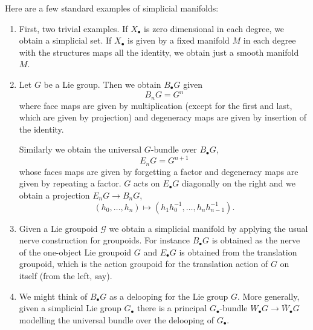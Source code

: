 \documentclass{amsart}
\begin{document}
\begin{example}
    Here are a few standard examples of simplicial manifolds: 
    \begin{enumerate}
        \item First, two trivial examples. If $X_\bullet$ is zero dimensional in 
            each degree, we obtain a simplicial set. If $X_\bullet$ is given by
            a fixed manifold $M$ in each degree with the structures maps all the
            identity, we obtain just a smooth manifold $M$.
        \item Let $G$ be a Lie group. Then we obtain $B_\bullet G$ given
            \begin{equation*}
                B_nG = G^n
            \end{equation*}
            where face maps are given by multiplication (except for the first 
            and last, which are given by projection) and degeneracy maps are 
            given by insertion of the identity.

            Similarly we obtain the universal $G$-bundle over $B_\bullet G$,
            \begin{equation*}
                E_nG = G^{n+1}
            \end{equation*}
            whose faces maps are given by forgetting a factor and degeneracy 
            maps are given by repeating a factor. $G$ acts on $E_\bullet G$ 
            diagonally on the right and we obtain a projection $E_nG\to B_nG$,
            \begin{equation*}
                (h_0,\ldots, h_n) \mapsto (h_1h_0^{-1},\ldots, 
                h_nh_{n-1}^{-1}).
            \end{equation*}
        \item Given a Lie groupoid $\mathcal{G}$ we obtain a simplicial manifold 
            by applying the usual nerve construction for groupoids. For instance 
            $B_\bullet G$ is obtained as the nerve of the one-object Lie 
            groupoid $G$ and $E_\bullet G$ is obtained from the translation 
            groupoid, which is the action groupoid for the translation 
            action of $G$ on itself (from the left, say).
        \item We might think of $B_\bullet G$ as a delooping for the Lie group 
            $G$. More generally, given a simplicial Lie group $G_\bullet$ there 
            is a principal $G_\bullet$-bundle $W_\bullet G\to \bar W_\bullet G$ 
            modelling the universal bundle over the delooping of $G_\bullet$.
    \end{enumerate}
\end{example}
\end{document}
